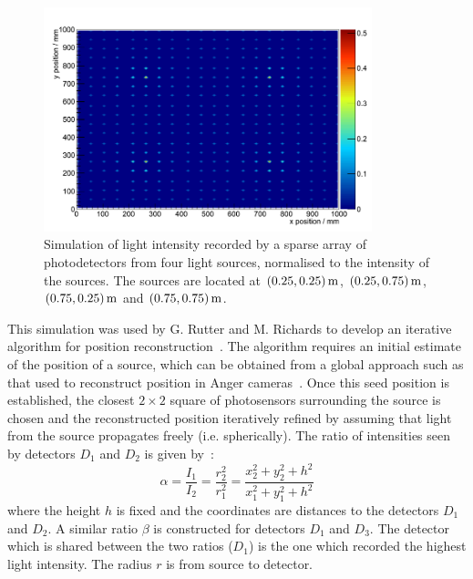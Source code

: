 \begin{figure}
\centering
\includegraphics[width=0.85\textwidth]{chapters/detectorphysics_images/four-sources}
\caption[Simulation of light intensity recorded by a sparse array of photodetectors]{\label{fig:flux-example}Simulation of light intensity recorded by a sparse array of photodetectors from four light sources, normalised to the intensity of the sources. The sources are located at $(0.25, 0.25) \metre$, $(0.25, 0.75) \metre$, $(0.75, 0.25)\metre$ and $(0.75, 0.75) \metre$.} 
\end{figure}

This simulation was used by G. Rutter and M. Richards to develop an iterative algorithm for position reconstruction~\citep{Rutter2011}. The algorithm requires an initial estimate of the position of a source, which can be obtained from a global approach such as that used to reconstruct position in Anger cameras~\citep{Anger1958}. Once this seed position is established, the closest $2\times 2$ square of photosensors surrounding the source is chosen and the reconstructed position iteratively refined by assuming that light from the source propagates freely (i.e. spherically). The ratio of intensities seen by detectors $D_1$ and $D_2$ is given by~\citep{Rutter2011}:
\begin{equation}\label{eqn:ratio-detector-intensities}
\alpha = \frac{I_1}{I_2} = \frac{r_2^2}{r_1^2} = \frac{x_2^2 + y_2^2 + h^2}{x_1^2 + y_1^2 + h^2} 
\end{equation}
where the height $h$ is fixed and the coordinates are distances to the detectors $D_1$ and $D_2$. A similar ratio $\beta$ is constructed for detectors $D_1$ and $D_3$. The detector which is shared between the two ratios ($D_1$) is the one which recorded the highest light intensity. The radius $r$ is from source to detector.

